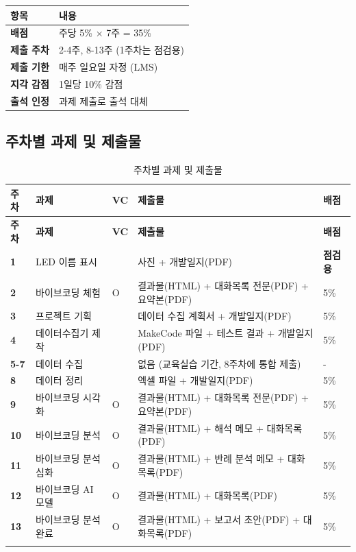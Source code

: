 \documentclass[11pt, a4paper]{article}
\begin{document}
\begin{table}[h]
\centering
\begin{tabular}{|L{3.5cm}|L{10cm}|}
\hline
{}
\textbf{항목} & \textbf{내용} \\
\hline
\textbf{배점} & 주당 5\% × 7주 = 35\% \\
\hline
\textbf{제출 주차} & 2-4주, 8-13주 (1주차는 점검용) \\
\hline
\textbf{제출 기한} & 매주 일요일 자정 (LMS) \\
\hline
\textbf{지각 감점} & 1일당 10\% 감점 \\
\hline
\textbf{출석 인정} & 과제 제출로 출석 대체 \\
\hline
\end{tabular}
\end{table}

\subsection{주차별 과제 및 제출물}

\begin{longtable}{|C{1cm}|L{2.5cm}|C{1cm}|L{5.5cm}|C{1.5cm}|}
\hline
{}
\textbf{주차} & \textbf{과제} & \textbf{VC} & \textbf{제출물} & \textbf{배점} \\
\hline
\endfirsthead
\hline
{}
\textbf{주차} & \textbf{과제} & \textbf{VC} & \textbf{제출물} & \textbf{배점} \\
\hline
\endhead
\textbf{1} & LED 이름 표시 & & 사진 + 개발일지(PDF) & \textbf{점검용} \\
\hline
\textbf{2} & 바이브코딩 체험 & O & 결과물(HTML) + 대화목록 전문(PDF) + 요약본(PDF) & 5\% \\
\hline
\textbf{3} & 프로젝트 기획 & & 데이터 수집 계획서 + 개발일지(PDF) & 5\% \\
\hline
\textbf{4} & 데이터수집기 제작 & & MakeCode 파일 + 테스트 결과 + 개발일지(PDF) & 5\% \\
\hline
\textbf{5-7} & 데이터 수집 & & 없음 (교육실습 기간, 8주차에 통합 제출) & - \\
\hline
\textbf{8} & 데이터 정리 & & 엑셀 파일 + 개발일지(PDF) & 5\% \\
\hline
\textbf{9} & 바이브코딩 시각화 & O & 결과물(HTML) + 대화목록 전문(PDF) + 요약본(PDF) & 5\% \\
\hline
\textbf{10} & 바이브코딩 분석 & O & 결과물(HTML) + 해석 메모 + 대화목록(PDF) & 5\% \\
\hline
\textbf{11} & 바이브코딩 분석 심화 & O & 결과물(HTML) + 반례 분석 메모 + 대화목록(PDF) & 5\% \\
\hline
\textbf{12} & 바이브코딩 AI 모델 & O & 결과물(HTML) + 대화목록(PDF) & 5\% \\
\hline
\textbf{13} & 바이브코딩 분석 완료 & O & 결과물(HTML) + 보고서 초안(PDF) + 대화목록(PDF) & 5\% \\
\hline
\caption{주차별 과제 및 제출물}
\end{longtable}
\end{document}
